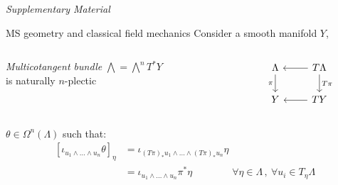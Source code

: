 \documentclass[beamer,10pt]{standalone}
\begin{document}

\begin{frame}
	\begin{center}
	\Huge\emph{Supplementary Material}
	\end{center}
\end{frame}
\note[itemize]{
	\item
}
\addtocounter{framenumber}{-1}



\begin{frame}[fragile]{MS geometry and classical field mechanics}\label{Frame:Ms-Field-Mechanics}
		Consider a smooth manifold $Y$,
		\begin{columns}
			\hfill
			\begin{column}{.5\linewidth}
				\emph{Multicotangent bundle} $\bigwedge = \bigwedge^n T^\ast Y$\\
				is naturally $n$-plectic
			\end{column}
			\begin{column}{.4\linewidth}
				\[
				\begin{tikzcd}
					\Lambda \ar[d,"\pi"'] & T \Lambda \ar[d,"T \pi"] \ar[l] \\
					Y								& T Y \ar[l]
				\end{tikzcd}	
				\]
			\end{column}
		\end{columns}
	\pause
	\begin{defblock}
		$\theta \in \Omega^n(\Lambda)$ such that:
		\begin{displaymath}
		\begin{split}
			\left[ \iota_{u_1 \wedge \ldots \wedge u_n} \theta \right]_\eta 
			&= \iota_{(T \pi)_\ast u_1 \wedge \ldots \wedge (T \pi)_\ast u_n} \eta \\
			&= \iota_{u_1 \wedge \ldots \wedge u_n} \pi^\ast \eta 
			\qquad \qquad \forall \eta \in \Lambda \, , \: \forall u_i \in T_\eta \Lambda 		
		\end{split}
		\end{displaymath}
	\end{defblock}
	\vfill
	\begin{columns}

\end{columns}
\end{frame}
\end{document}
